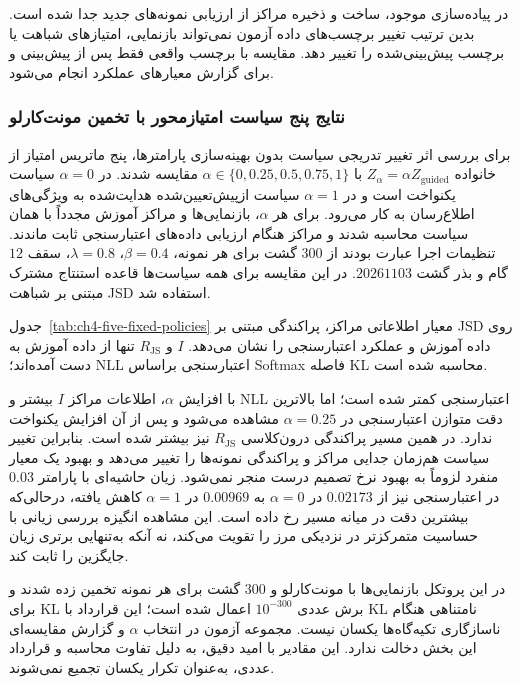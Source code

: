 در پیاده‌سازی موجود، ساخت و ذخیره مراکز از ارزیابی نمونه‌های جدید جدا شده است. بدین ترتیب تغییر برچسب‌های داده آزمون نمی‌تواند بازنمایی، امتیازهای شباهت یا برچسب پیش‌بینی‌شده را تغییر دهد. مقایسه با برچسب واقعی فقط پس از پیش‌بینی و برای گزارش معیارهای عملکرد انجام می‌شود.


\subsubsection{نتایج پنج سیاست امتیازمحور با تخمین مونت‌کارلو}
\label{subsec:ch4-fixed-policy-metric-comparison}
برای بررسی اثر تغییر تدریجی سیاست بدون بهینه‌سازی پارامترها، پنج ماتریس امتیاز از خانواده
$Z_\alpha=\alpha Z_{\mathrm{guided}}$ با $\alpha\in\{0,0.25,0.5,0.75,1\}$ مقایسه شدند. در $\alpha=0$ سیاست یکنواخت است و در $\alpha=1$ سیاست ازپیش‌تعیین‌شده هدایت‌شده به ویژگی‌های اطلاع‌رسان به کار می‌رود. برای هر $\alpha$، بازنمایی‌ها و مراکز آموزش مجدداً با همان سیاست محاسبه شدند و مراکز هنگام ارزیابی داده‌های اعتبارسنجی ثابت ماندند. تنظیمات اجرا عبارت بودند از $300$ گشت برای هر نمونه، $\beta=0.4$، $\lambda=0.8$، سقف $12$ گام و بذر گشت $20261103$. در این مقایسه برای همه سیاست‌ها قاعده استنتاج مشترک مبتنی بر شباهت JSD استفاده شد.

جدول~\ref{tab:ch4-five-fixed-policies} معیار اطلاعاتی مراکز، پراکندگی مبتنی بر JSD روی داده آموزش و عملکرد اعتبارسنجی را نشان می‌دهد. $I$ و $R_{\mathrm{JS}}$ تنها از داده آموزش به دست آمده‌اند؛ NLL اعتبارسنجی براساس Softmax فاصله KL محاسبه شده است.


با افزایش $\alpha$، اطلاعات مراکز $I$ بیشتر و NLL اعتبارسنجی کمتر شده است؛ اما بالاترین دقت متوازن اعتبارسنجی در $\alpha=0.25$ مشاهده می‌شود و پس از آن افزایش یکنواخت ندارد. در همین مسیر پراکندگی درون‌کلاسی $R_{\mathrm{JS}}$ نیز بیشتر شده است. بنابراین تغییر سیاست هم‌زمان جدایی مراکز و پراکندگی نمونه‌ها را تغییر می‌دهد و بهبود یک معیار منفرد لزوماً به بهبود نرخ تصمیم درست منجر نمی‌شود. زیان  حاشیه‌ای با پارامتر $0.03$ در اعتبارسنجی نیز از $0.02173$ در $\alpha=0$ به $0.00969$ در $\alpha=1$ کاهش یافته، درحالی‌که بیشترین دقت در میانه مسیر رخ داده است. این مشاهده انگیزه بررسی زیانی با حساسیت متمرکزتر در نزدیکی مرز را تقویت می‌کند، نه آنکه به‌تنهایی برتری زیان جایگزین را ثابت کند.

در این پروتکل بازنمایی‌ها با مونت‌کارلو و $300$ گشت برای هر نمونه تخمین زده شدند و برای KL برش عددی $10^{-300}$ اعمال شده است؛ این قرارداد با KL نامتناهی هنگام ناسازگاری تکیه‌گاه‌ها یکسان نیست. مجموعه آزمون در انتخاب $\alpha$ و گزارش مقایسه‌ای این بخش دخالت ندارد. این مقادیر با امید دقیق، به دلیل تفاوت محاسبه و قرارداد عددی، به‌عنوان تکرار یکسان تجمیع نمی‌شوند.

